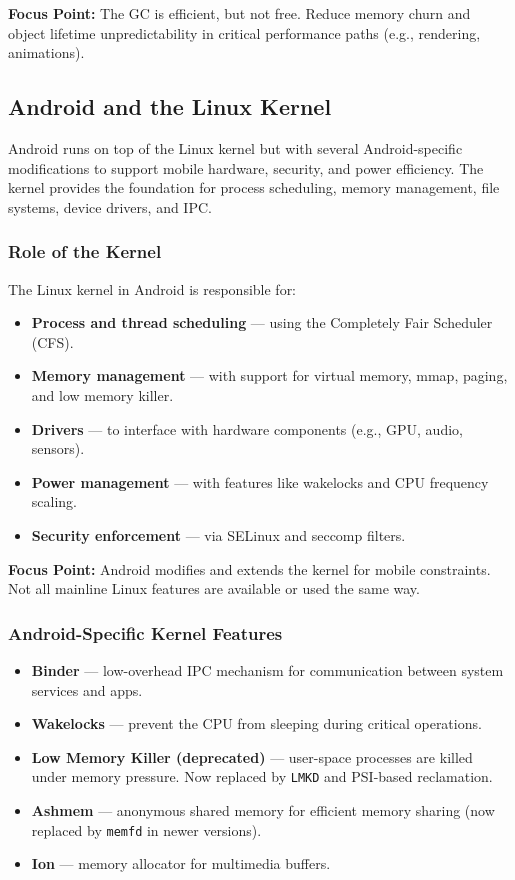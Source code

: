 \documentclass[a4paper,12pt]{article}
\begin{document}
\textbf{Focus Point:} The GC is efficient, but not free. Reduce memory churn and object lifetime unpredictability in critical performance paths (e.g., rendering, animations).

\subsection{Android and the Linux Kernel}

Android runs on top of the Linux kernel but with several Android-specific modifications to support mobile hardware, security, and power efficiency. The kernel provides the foundation for process scheduling, memory management, file systems, device drivers, and IPC.

\subsubsection{Role of the Kernel}

The Linux kernel in Android is responsible for:

\begin{itemize}
  \item \textbf{Process and thread scheduling} — using the Completely Fair Scheduler (CFS).
  \item \textbf{Memory management} — with support for virtual memory, mmap, paging, and low memory killer.
  \item \textbf{Drivers} — to interface with hardware components (e.g., GPU, audio, sensors).
  \item \textbf{Power management} — with features like wakelocks and CPU frequency scaling.
  \item \textbf{Security enforcement} — via SELinux and seccomp filters.
\end{itemize}

\textbf{Focus Point:} Android modifies and extends the kernel for mobile constraints. Not all mainline Linux features are available or used the same way.

\subsubsection{Android-Specific Kernel Features}

\begin{itemize}
  \item \textbf{Binder} — low-overhead IPC mechanism for communication between system services and apps.
  \item \textbf{Wakelocks} — prevent the CPU from sleeping during critical operations.
  \item \textbf{Low Memory Killer (deprecated)} — user-space processes are killed under memory pressure. Now replaced by \texttt{LMKD} and PSI-based reclamation.
  \item \textbf{Ashmem} — anonymous shared memory for efficient memory sharing (now replaced by \texttt{memfd} in newer versions).
  \item \textbf{Ion} — memory allocator for multimedia buffers.
\end{itemize}
\end{document}
